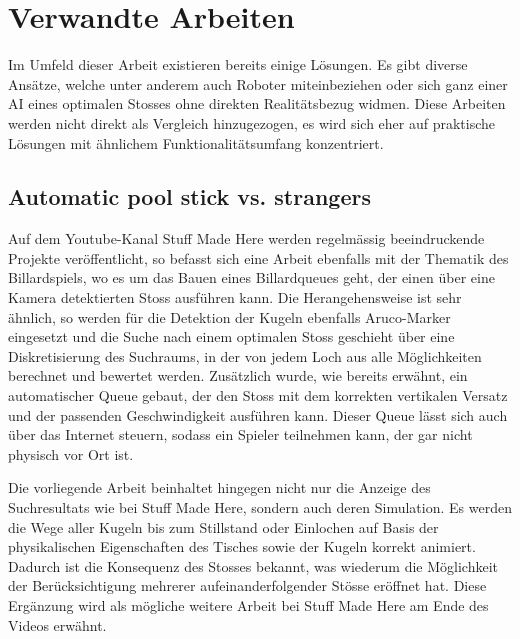 \section{Verwandte Arbeiten}
Im Umfeld dieser Arbeit existieren bereits einige Lösungen. Es gibt diverse Ansätze, welche
unter anderem auch Roboter miteinbeziehen\cite{qucosa:ein_billardroboter:1} oder sich ganz einer AI eines
optimalen Stosses ohne direkten Realitätsbezug widmen\cite{inproceedings:billiard_ai:1}. Diese Arbeiten werden nicht
direkt als Vergleich hinzugezogen, es wird sich eher auf praktische Lösungen mit ähnlichem Funktionalitätsumfang
konzentriert.

\subsection{Automatic pool stick vs. strangers}
Auf dem Youtube-Kanal \glqq Stuff Made Here\grqq{} werden regelmässig beeindruckende Projekte veröffentlicht, so befasst
sich eine Arbeit ebenfalls mit der Thematik des Billardspiels, wo es um das Bauen eines Billardqueues geht, der einen
über eine Kamera detektierten Stoss ausführen kann\cite{stuffmadehere:automaticpoolstick}. Die Herangehensweise ist
sehr ähnlich, so werden für die Detektion der Kugeln ebenfalls Aruco-Marker eingesetzt und die Suche nach einem optimalen
Stoss geschieht über eine Diskretisierung des Suchraums, in der von jedem Loch aus alle Möglichkeiten berechnet und
bewertet werden. Zusätzlich wurde, wie bereits erwähnt, ein automatischer Queue gebaut, der den Stoss mit dem korrekten
vertikalen Versatz und der passenden Geschwindigkeit ausführen kann. Dieser Queue lässt sich auch über das Internet
steuern, sodass ein Spieler teilnehmen kann, der gar nicht physisch vor Ort ist.

Die vorliegende Arbeit beinhaltet hingegen nicht nur die Anzeige des Suchresultats wie bei \glqq Stuff Made Here\grqq{},
sondern auch deren Simulation. Es werden die Wege aller Kugeln bis zum
Stillstand oder Einlochen auf Basis der physikalischen Eigenschaften des Tisches sowie der Kugeln korrekt animiert.
Dadurch ist die Konsequenz des Stosses bekannt, was wiederum die Möglichkeit der Berücksichtigung
mehrerer aufeinanderfolgender Stösse eröffnet hat.
Diese Ergänzung wird als mögliche weitere Arbeit bei \glqq Stuff Made Here\grqq{} am Ende des Videos erwähnt.


